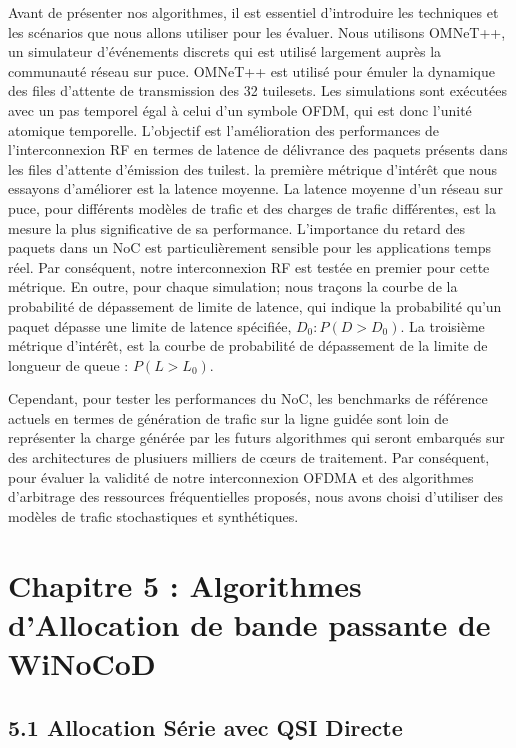 Avant de présenter nos algorithmes, il est essentiel d'introduire les techniques et les scénarios que nous allons utiliser pour les évaluer. Nous utilisons OMNeT++, un simulateur d'événements discrets qui est utilisé largement auprès la communauté réseau sur puce. OMNeT++ est utilisé pour émuler la dynamique des files d'attente de transmission des 32 tuilesets. Les simulations sont exécutées avec un pas temporel égal à celui d’un symbole OFDM, qui est donc l'unité atomique temporelle. L’objectif est l'amélioration des performances de l’interconnexion RF en termes de latence de délivrance des paquets présents dans les files d’attente d’émission des tuilest. la première métrique d'intérêt que nous essayons d'améliorer est la latence moyenne. La latence moyenne d’un réseau sur puce, pour différents modèles de trafic et des charges de trafic différentes, est la mesure la plus significative de sa performance. L'importance du retard des paquets dans un NoC est particulièrement sensible pour les applications temps réel. Par conséquent, notre interconnexion RF est testée en premier pour cette métrique. En outre, pour chaque simulation; nous traçons la courbe de la probabilité de dépassement de limite de latence, qui indique la probabilité qu'un paquet dépasse une limite de latence spécifiée, $D_{0} : P (D> D_{0})$. La troisième métrique d'intérêt, est la courbe de probabilité de dépassement de la limite de longueur de queue : $P (L> L_{0})$.

Cependant, pour tester les performances du NoC, les benchmarks de référence actuels en termes de génération de trafic sur la ligne guidée sont loin de représenter la charge générée par les futurs algorithmes qui seront embarqués sur des architectures de plusiuers milliers de cœurs de traitement. Par conséquent, pour évaluer la validité de notre interconnexion OFDMA et des algorithmes d'arbitrage des ressources fréquentielles proposés, nous avons choisi d'utiliser des modèles de trafic stochastiques et synthétiques.

\section*{Chapitre 5 : Algorithmes d'Allocation de bande passante de WiNoCoD}

\subsection*{5.1 Allocation Série avec QSI Directe}

